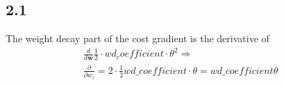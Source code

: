 \documentclass{article}
\begin{document}
\subsection*{2.1}

The weight decay part of the cost gradient is the derivative of
\begin{align}
  \frac{d}{d\mathbf{w}}\frac{1}{2}\cdot wd_coefficient \cdot \theta^2 \Rightarrow \\
  \nonumber \frac{\partial}{\partial w_i} = 2 \cdot \frac{1}{2} wd\_coefficient \cdot \theta = wd\_coefficient \theta
\end{align}
\end{document}
